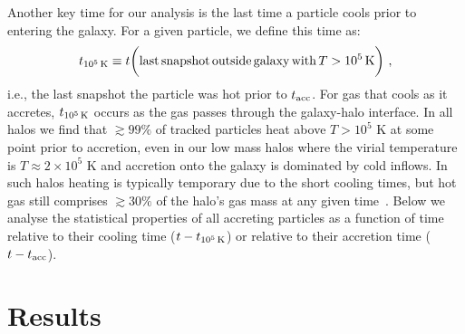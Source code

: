 \documentclass[fleqn,usenatbib]{mnras}
\newcommand{\tcools}{t_{10^5\,{\rm K}}}
\newcommand{\tacc}{t_{\rm acc}}
\begin{document}
Another key time for our analysis is the last time a particle cools prior to entering the galaxy.
For a given particle, we define this time as:
\begin{equation}
    \tcools \equiv t \bigg( {\rm last\,snapshot\,outside\,galaxy\,with\,}T>10^5\,{\rm K} \bigg) ~,
\label{e: tcools}
\end{equation}
i.e., the last snapshot the particle was hot prior to $\tacc$.
For gas that cools as it accretes, $\tcools$ occurs as the gas passes through the galaxy-halo interface.
In all halos we find that $\gtrsim99\%$ of tracked particles heat above $T > 10^5$ K at some point prior to accretion, even in our low mass halos where the virial temperature is $T \approx 2 \times 10^5$ K and  accretion onto the galaxy is dominated by cold inflows. 
In such halos heating is typically temporary due to the short cooling times, but hot gas still comprises $\gtrsim 30\%$ of the halo's gas mass at any given time~\cite{Hafen2019,Hafen2020}.
Below we analyse the statistical properties of all accreting particles as a function of time relative to their cooling time ($t-\tcools$) or relative to their accretion time ($t-\tacc$).

\section{Results}
\label{s: results}
\end{document}
